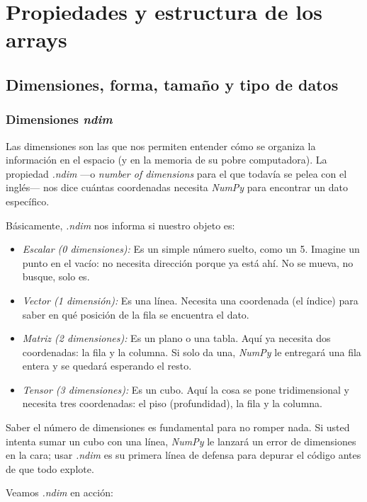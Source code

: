 \section{Propiedades y estructura de los arrays}

\subsection{Dimensiones, forma, tamaño y tipo de datos}

\subsubsection{Dimensiones \textit{ndim}}

Las dimensiones son las que nos permiten entender cómo se organiza la información en el espacio (y en la memoria de su pobre computadora). La propiedad \textit{.ndim} —o \textit{number of dimensions} para el que todavía se pelea con el inglés— nos dice cuántas coordenadas necesita \textit{NumPy} para encontrar un dato específico.

Básicamente, \textit{.ndim} nos informa si nuestro objeto es:

\begin{itemize}
\item \textit{Escalar (0 dimensiones):} Es un simple número suelto, como un 5. Imagine un punto en el vacío: no necesita dirección porque ya está ahí. No se mueva, no busque, solo es.
\item \textit{Vector (1 dimensión):} Es una línea. Necesita una coordenada (el índice) para saber en qué posición de la fila se encuentra el dato.
\item \textit{Matriz (2 dimensiones):} Es un plano o una tabla. Aquí ya necesita dos coordenadas: la fila y la columna. Si solo da una, \textit{NumPy} le entregará una fila entera y se quedará esperando el resto.
\item \textit{Tensor (3 dimensiones):} Es un cubo. Aquí la cosa se pone tridimensional y necesita tres coordenadas: el piso (profundidad), la fila y la columna.
\end{itemize}

Saber el número de dimensiones es fundamental para no romper nada. Si usted intenta sumar un cubo con una línea, \textit{NumPy} le lanzará un error de dimensiones en la cara; usar \textit{.ndim} es su primera línea de defensa para depurar el código antes de que todo explote.

Veamos \textit{.ndim} en acción:

